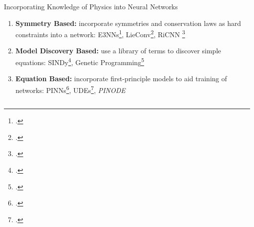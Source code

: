 \documentclass[8pt]{beamer}
\begin{document}
\begin{frame}{Incorporating Knowledge of Physics into Neural Networks}
\begin{enumerate}
	\item<2-> \textbf{Symmetry Based:} incorporate symmetries and conservation laws as hard constraints into a network: E3NNs\footcite{geiger2022e3nn}, LieConv\footcite{Finzi2020}, RiCNN \footcite{chidester2018rotation}
	\item<3-> \textbf{Model Discovery Based:} use a library of terms to discover simple equations: SINDy\footcite{champion2019data}, Genetic Programming\footcite{schmidt2009distilling}
	\item<4-> \textbf{Equation Based:} incorporate first-principle models to aid training of networks: PINNs\footcite{raissi2017physics}, UDEs\footcite{rackauckas2020udes}, \textit{PINODE}
\end{enumerate}

\begin{columns}[T,onlytextwidth]
\end{columns}

\end{frame}
\end{document}
